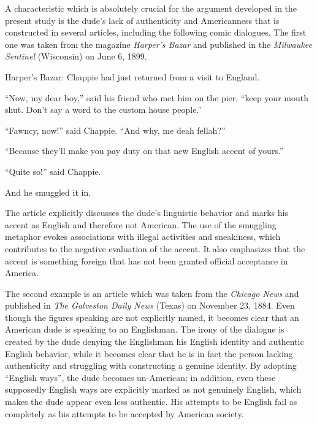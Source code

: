 A characteristic which is absolutely crucial for the argument developed in the present study is the dude’s lack of authenticity and Americanness that is constructed in several articles, including the following comic dialogues. The first one was taken from the magazine \emph{Harper’s Bazar} and published in the \emph{Milwaukee Sentinel} (Wisconsin) on June 6, 1899.


\begin{ipquote}
\begin{center}
\end{center}
Harper’s Bazar: Chappie had just returned from a visit to England.

“Now, my dear boy,” said his friend who met him on the pier, “keep your mouth shut. Don’t say a word to the custom house people.”

“Fawncy, now!” said Chappie. “And why, me deah fellah?”

“Because they’ll make you pay duty on that new English accent of yours.”

“Quite so!” said Chappie.

And he smuggled it in.
\end{ipquote}


The article explicitly discusses the dude’s linguistic behavior and marks his accent as English and therefore not American. The use of the smuggling metaphor evokes associations with illegal activities and sneakiness, which contributes to the negative evaluation of the accent. It also emphasizes that the accent is something foreign that has not been granted official acceptance in America.


The second example is an article which was taken from the \emph{Chicago News} and published in \emph{The Galveston Daily News} (Texas) on November 23, 1884. Even though the figures speaking are not explicitly named, it becomes clear that an American dude is speaking to an Englishman. The irony of the dialogue is created by the dude denying the Englishman his English identity and authentic English behavior, while it becomes clear that he is in fact the person lacking authenticity and struggling with constructing a genuine identity. By adopting “English ways”, the dude becomes un-American; in addition, even these supposedly English ways are explicitly marked as not genuinely English, which makes the dude appear even less authentic. His attempts to be English fail as completely as his attempts to be accepted by American society.

